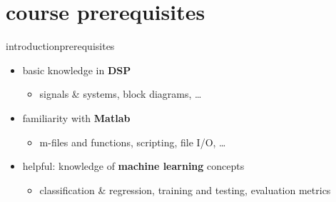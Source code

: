     \section[course prerequisites]{course prerequisites}
        \begin{frame}{introduction}{prerequisites}
            \begin{itemize}
                \item   basic knowledge in \textbf{DSP}
                    \begin{itemize}
                        \item signals \& systems, block diagrams, \ldots
                    \end{itemize}
                \bigskip
                \item	familiarity with \textbf{Matlab} 
                    \begin{itemize}
                        \item   m-files and functions, scripting, file I/O, \ldots
                    \end{itemize}
                \bigskip
                \item	helpful: knowledge of \textbf{machine learning} concepts
                    \begin{itemize}
                        \item   classification \& regression, training and testing, evaluation metrics
                    \end{itemize}
            \end{itemize}
        \end{frame}

